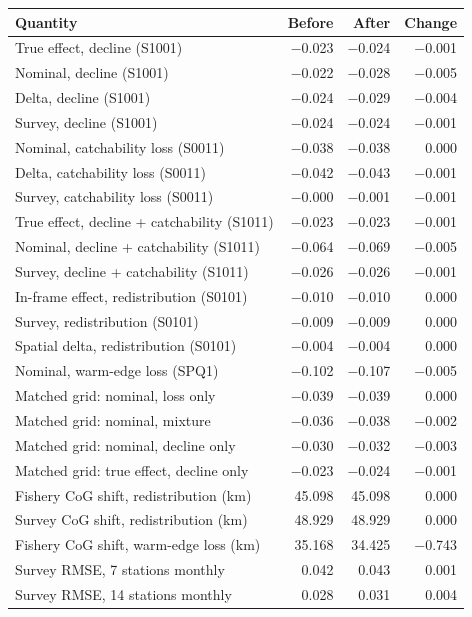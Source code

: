 \begin{tabular}{@{}lrrr@{}}
\toprule
Quantity & Before & After & Change \\
\midrule
True effect, decline (S1001) & $-$0.023 & $-$0.024 & $-$0.001 \\
Nominal, decline (S1001) & $-$0.022 & $-$0.028 & $-$0.005 \\
Delta, decline (S1001) & $-$0.024 & $-$0.029 & $-$0.004 \\
Survey, decline (S1001) & $-$0.024 & $-$0.024 & $-$0.001 \\
Nominal, catchability loss (S0011) & $-$0.038 & $-$0.038 & 0.000 \\
Delta, catchability loss (S0011) & $-$0.042 & $-$0.043 & $-$0.001 \\
Survey, catchability loss (S0011) & $-$0.000 & $-$0.001 & $-$0.001 \\
True effect, decline + catchability (S1011) & $-$0.023 & $-$0.023 & $-$0.001 \\
Nominal, decline + catchability (S1011) & $-$0.064 & $-$0.069 & $-$0.005 \\
Survey, decline + catchability (S1011) & $-$0.026 & $-$0.026 & $-$0.001 \\
In-frame effect, redistribution (S0101) & $-$0.010 & $-$0.010 & 0.000 \\
Survey, redistribution (S0101) & $-$0.009 & $-$0.009 & 0.000 \\
Spatial delta, redistribution (S0101) & $-$0.004 & $-$0.004 & 0.000 \\
Nominal, warm-edge loss (SPQ1) & $-$0.102 & $-$0.107 & $-$0.005 \\
Matched grid: nominal, loss only & $-$0.039 & $-$0.039 & 0.000 \\
Matched grid: nominal, mixture & $-$0.036 & $-$0.038 & $-$0.002 \\
Matched grid: nominal, decline only & $-$0.030 & $-$0.032 & $-$0.003 \\
Matched grid: true effect, decline only & $-$0.023 & $-$0.024 & $-$0.001 \\
Fishery CoG shift, redistribution (km) & 45.098 & 45.098 & 0.000 \\
Survey CoG shift, redistribution (km) & 48.929 & 48.929 & 0.000 \\
Fishery CoG shift, warm-edge loss (km) & 35.168 & 34.425 & $-$0.743 \\
Survey RMSE, 7 stations monthly & 0.042 & 0.043 & 0.001 \\
Survey RMSE, 14 stations monthly & 0.028 & 0.031 & 0.004 \\

\end{tabular}

